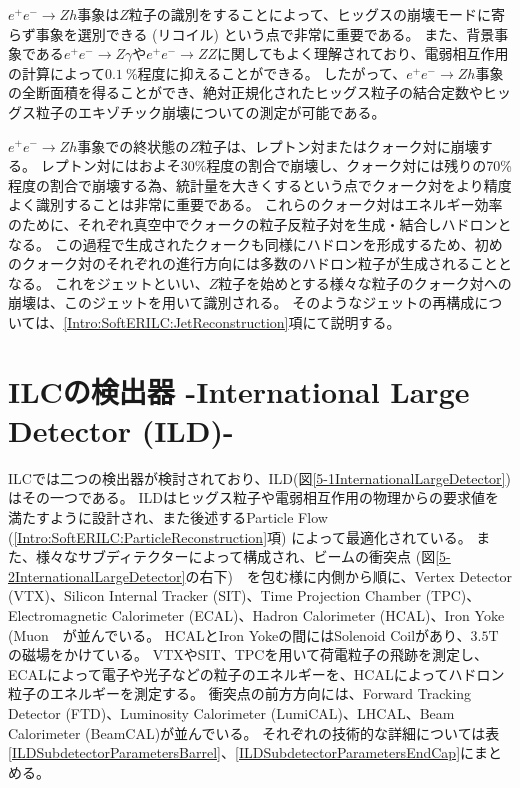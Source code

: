 $e^+e^- \to Zh$事象は$Z$粒子の識別をすることによって、ヒッグスの崩壊モードに寄らず事象を選別できる (リコイル) という点で非常に重要である。
また、背景事象である$e^+e^- \to Z\gamma$や$e^+e^- \to ZZ$に関してもよく理解されており、電弱相互作用の計算によって$0.1\ \%$程度に抑えることができる。\cite{GlobalProject}
したがって、$e^+e^- \to Zh$事象の全断面積を得ることができ、絶対正規化されたヒッグス粒子の結合定数やヒッグス粒子のエキゾチック崩壊についての測定が可能である。

$e^+e^- \to Zh$事象での終状態の$Z$粒子は、レプトン対またはクォーク対に崩壊する。
レプトン対にはおよそ30\%程度の割合で崩壊し、クォーク対には残りの70\%程度の割合で崩壊する為、統計量を大きくするという点でクォーク対をより精度よく識別することは非常に重要である。
これらのクォーク対はエネルギー効率のために、それぞれ真空中でクォークの粒子反粒子対を生成・結合しハドロンとなる。
この過程で生成されたクォークも同様にハドロンを形成するため、初めのクォーク対のそれぞれの進行方向には多数のハドロン粒子が生成されることとなる。
これをジェットといい、$Z$粒子を始めとする様々な粒子のクォーク対への崩壊は、このジェットを用いて識別される。
そのようなジェットの再構成については、\ref{Intro:SoftERILC:JetReconstruction}項にて説明する。

\section{ILCの検出器 -International Large Detector (ILD)-} \label{Intro:InternationalLargeDetector}

ILCでは二つの検出器が検討されており、ILD(図\ref{5-1InternationalLargeDetector})はその一つである。
ILDはヒッグス粒子や電弱相互作用の物理からの要求値を満たすように設計され、また後述するParticle Flow (\ref{Intro:SoftERILC:ParticleReconstruction}項) によって最適化されている。
また、様々なサブディテクターによって構成され、ビームの衝突点 (図\ref{5-2InternationalLargeDetector}の右下)　を包む様に内側から順に、Vertex Detector (VTX)、Silicon Internal Tracker (SIT)、Time Projection Chamber (TPC)、Electromagnetic Calorimeter (ECAL)、Hadron Calorimeter (HCAL)、Iron Yoke　(Muon　が並んでいる。
HCALとIron Yokeの間にはSolenoid Coilがあり、$3.5 \mathrm{T}$の磁場をかけている。
VTXやSIT、TPCを用いて荷電粒子の飛跡を測定し、ECALによって電子や光子などの粒子のエネルギーを、HCALによってハドロン粒子のエネルギーを測定する。
衝突点の前方方向には、Forward Tracking Detector (FTD)、Luminosity Calorimeter (LumiCAL)、LHCAL、Beam Calorimeter (BeamCAL)が並んでいる。
それぞれの技術的な詳細については表\ref{ILDSubdetectorParametersBarrel}、\ref{ILDSubdetectorParametersEndCap}にまとめる。

